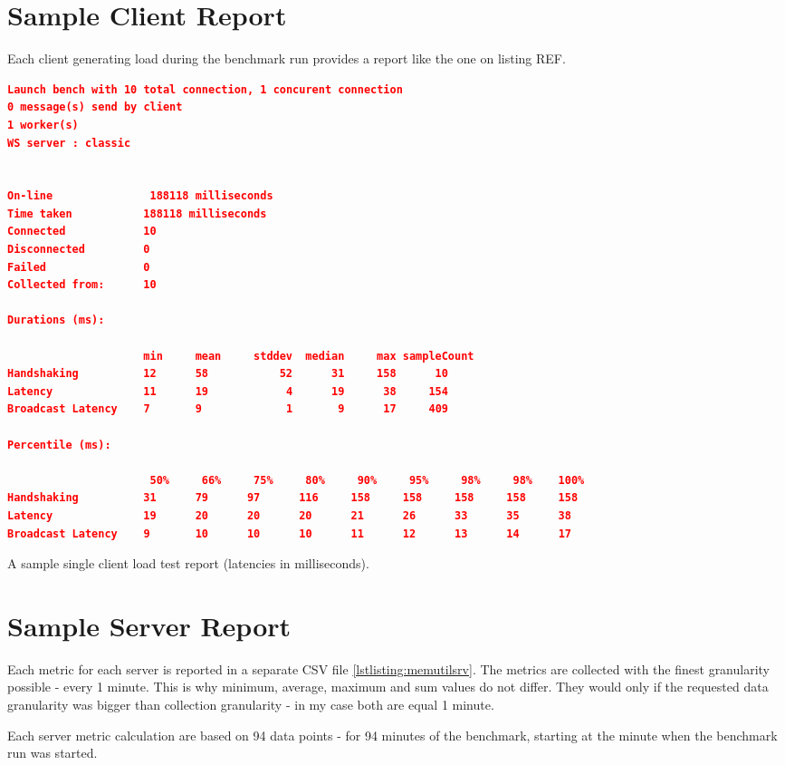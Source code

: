 \documentclass{uvamscse}
\begin{document}
\section{Sample Client Report}\label{Client Report}
Each client generating load during the benchmark run provides a report like the one on listing REF.

\begin{sourcecode}[H]
\begin{lstlisting}[language=json]
Launch bench with 10 total connection, 1 concurent connection
0 message(s) send by client
1 worker(s)
WS server : classic


On-line               188118 milliseconds
Time taken           188118 milliseconds
Connected            10
Disconnected         0
Failed               0
Collected from:      10

Durations (ms):

                     min     mean     stddev  median     max sampleCount
Handshaking          12      58           52      31     158      10
Latency              11      19            4      19      38     154
Broadcast Latency    7       9             1       9      17     409

Percentile (ms):

                      50%     66%     75%     80%     90%     95%     98%     98%    100%
Handshaking          31      79      97      116     158     158     158     158     158
Latency              19      20      20      20      21      26      33      35      38
Broadcast Latency    9       10      10      10      11      12      13      14      17
\end{lstlisting}
\caption{A sample single client load test report (latencies in milliseconds).}
\label{lstlisting:prediction}
\end{sourcecode}

\section{Sample Server Report}
Each metric for each server is reported in a separate CSV file \ref{lstlisting:memutilsrv}. The metrics are collected with the finest granularity possible - every 1 minute. This is why minimum, average, maximum and sum values do not differ. They would only if the requested data granularity was bigger than collection granularity - in my case both are equal 1 minute.

Each server metric calculation are based on 94 data points - for 94 minutes of the benchmark, starting at the minute when the benchmark run was started.
\end{document}
